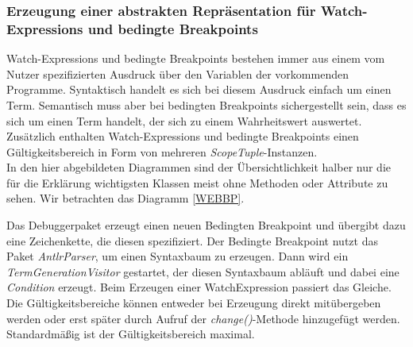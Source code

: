 \documentclass[parskip=full]{scrartcl}
\begin{document}
\subsubsection{Erzeugung einer abstrakten Repräsentation für Watch-Expressions und bedingte Breakpoints}
Watch-Expressions und bedingte Breakpoints bestehen immer aus einem vom Nutzer spezifizierten Ausdruck über den Variablen der vorkommenden Programme. 
Syntaktisch handelt es sich bei diesem Ausdruck einfach um einen Term. 
Semantisch muss aber bei bedingten Breakpoints sichergestellt sein, dass es sich um einen Term handelt, der sich zu einem Wahrheitswert auswertet. 
Zusätzlich enthalten Watch-Expressions und bedingte Breakpoints einen Gültigkeitsbereich in Form von mehreren \textit{ScopeTuple}-Instanzen. 
\\
In den hier abgebildeten Diagrammen sind der Übersichtlichkeit halber nur die für die Erklärung wichtigsten Klassen meist ohne Methoden oder Attribute zu sehen.
Wir betrachten das Diagramm \ref{WEBBP}.  
\begin{center}
\label{WEBBP}
\end{center}
Das Debuggerpaket erzeugt einen neuen Bedingten Breakpoint und übergibt dazu eine Zeichenkette, die diesen spezifiziert. 
Der Bedingte Breakpoint nutzt das Paket \textit{AntlrParser}, um einen Syntaxbaum zu erzeugen. 
Dann wird ein \textit{TermGenerationVisitor} gestartet, der diesen Syntaxbaum abläuft und dabei eine \textit{Condition} erzeugt. 
Beim Erzeugen einer WatchExpression passiert das Gleiche. 
Die Gültigkeitsbereiche können entweder bei Erzeugung direkt mitübergeben werden oder erst später durch Aufruf der \textit{change()}-Methode hinzugefügt werden. 
Standardmäßig ist der Gültigkeitsbereich maximal.
\newpage
\end{document}
